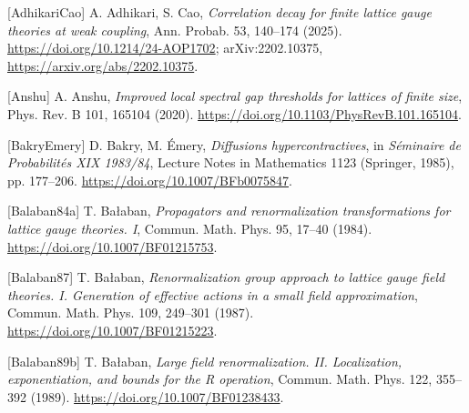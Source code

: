 \documentclass[10pt,letterpaper,twocolumn]{article}
\begin{document}
{[}AdhikariCao{]} A. Adhikari, S. Cao, \emph{Correlation decay for finite lattice gauge theories at weak coupling}, Ann. Probab. 53, 140--174 (2025). \href{https://doi.org/10.1214/24-AOP1702}{https:\allowbreak{}/\allowbreak{}/\allowbreak{}doi.\allowbreak{}org/\allowbreak{}10.\allowbreak{}1214/\allowbreak{}24-\allowbreak{}AOP1702}; arXiv:2202.10375, \href{https://arxiv.org/abs/2202.10375}{https:\allowbreak{}/\allowbreak{}/\allowbreak{}arxiv.\allowbreak{}org/\allowbreak{}abs/\allowbreak{}2202.\allowbreak{}10375}.

{[}Anshu{]} A. Anshu, \emph{Improved local spectral gap thresholds for lattices of finite size}, Phys. Rev. B 101, 165104 (2020). \href{https://doi.org/10.1103/PhysRevB.101.165104}{https:\allowbreak{}/\allowbreak{}/\allowbreak{}doi.\allowbreak{}org/\allowbreak{}10.\allowbreak{}1103/\allowbreak{}PhysRevB\allowbreak{}.\allowbreak{}101.\allowbreak{}165104}.

{[}BakryEmery{]} D. Bakry, M. Émery, \emph{Diffusions hypercontractives}, in \emph{Séminaire de Probabilités XIX 1983/84}, Lecture Notes in Mathematics 1123 (Springer, 1985), pp. 177--206. \href{https://doi.org/10.1007/BFb0075847}{https:\allowbreak{}/\allowbreak{}/\allowbreak{}doi.\allowbreak{}org/\allowbreak{}10.\allowbreak{}1007/\allowbreak{}BFb00758\allowbreak{}47}.

{[}Balaban84a{]} T. Bałaban, \emph{Propagators and renormalization transformations for lattice gauge theories. I}, Commun. Math. Phys. 95, 17--40 (1984). \href{https://doi.org/10.1007/BF01215753}{https:\allowbreak{}/\allowbreak{}/\allowbreak{}doi.\allowbreak{}org/\allowbreak{}10.\allowbreak{}1007/\allowbreak{}BF012157\allowbreak{}53}.

{[}Balaban87{]} T. Bałaban, \emph{Renormalization group approach to lattice gauge field theories. I. Generation of effective actions in a small field approximation}, Commun. Math. Phys. 109, 249--301 (1987). \href{https://doi.org/10.1007/BF01215223}{https:\allowbreak{}/\allowbreak{}/\allowbreak{}doi.\allowbreak{}org/\allowbreak{}10.\allowbreak{}1007/\allowbreak{}BF012152\allowbreak{}23}.

{[}Balaban89b{]} T. Bałaban, \emph{Large field renormalization. II. Localization, exponentiation, and bounds for the R operation}, Commun. Math. Phys. 122, 355--392 (1989). \href{https://doi.org/10.1007/BF01238433}{https:\allowbreak{}/\allowbreak{}/\allowbreak{}doi.\allowbreak{}org/\allowbreak{}10.\allowbreak{}1007/\allowbreak{}BF012384\allowbreak{}33}.
\end{document}
